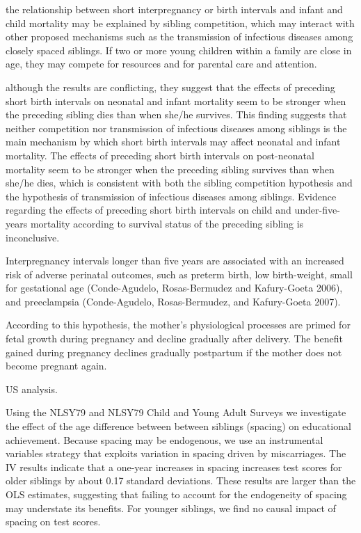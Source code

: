 the relationship between short interpregnancy or birth intervals and
infant and child mortality may be explained by sibling competition,
which may interact with other proposed mechanisms such as the
transmission of infectious diseases among closely spaced siblings. If
two or more young children within a family are close in age, they may
compete for resources and for parental care and attention.

although the results are conflicting, they suggest that the effects of
preceding short birth intervals on neonatal and infant mortality seem to
be stronger when the preceding sibling dies than when she/he survives.
This finding suggests that neither competition nor transmission of
infectious diseases among siblings is the main mechanism by which short
birth intervals may affect neonatal and infant mortality. The effects of
preceding short birth intervals on post-neonatal mortality seem to be
stronger when the preceding sibling survives than when she/he dies,
which is consistent with both the sibling competition hypothesis and the
hypothesis of transmission of infectious diseases among siblings.
Evidence regarding the effects of preceding short birth intervals on
child and under-five-years mortality according to survival status of the
preceding sibling is inconclusive.

Interpregnancy intervals longer than five years are associated with an
increased risk of adverse perinatal outcomes, such as preterm birth, low
birth-weight, small for gestational age (Conde-Agudelo, Rosas-Bermudez
and Kafury-Goeta 2006), and preeclampsia (Conde-Agudelo, Rosas-Bermudez,
and Kafury-Goeta 2007).

According to this hypothesis, the mother’s physiological processes are
primed for fetal growth during pregnancy and decline gradually after
delivery. The benefit gained during pregnancy declines gradually
postpartum if the mother does not become pregnant again.

\citet{Buckles2012}

US analysis.

Using the NLSY79 and NLSY79 Child and Young Adult Surveys we investigate 
the effect of the age difference between between siblings (spacing) on
educational achievement. Because spacing may be endogenous, we use an
instrumental variables strategy that exploits variation in spacing driven
by miscarriages. The IV results indicate that a one-year increases in
spacing increases test scores for older siblings by about 0.17 standard
deviations. These results are larger than the OLS estimates, suggesting
that failing to account for the endogeneity of spacing may understate
its benefits. For younger siblings, we find no causal impact of spacing
on test scores.

